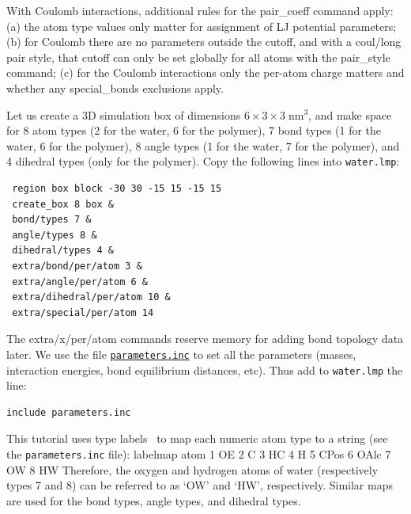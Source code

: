 \documentclass[9pt,tutorial]{livecoms}
\newcommand{\lmpcmd}[1]{\colorbox{listing}{\textcolor{command}{\small{#1}}}} %
\newcommand{\lmpcmdnote}[1]{\colorbox{note_listing}{\textcolor{command}{\small{#1}}}} %
\newcommand{\flecmd}[1]{\textcolor{command}{\texttt{#1}}} %
\newcommand{\dwlcmd}[1]{\textcolor{download}{\texttt{#1}}} %
\newcommand{\filepath}{https://raw.githubusercontent.com/lammpstutorials/lammpstutorials-article/main/files/}
\begin{document}
\begin{note} {\color{blue}With Coulomb interactions, additional rules
    for the \lmpcmd{pair\_coeff} command apply: (a) the atom type values
    only matter for assignment of LJ potential parameters; (b) for Coulomb
    there are no parameters outside the cutoff, and with a
    \lmpcmd{coul/long} pair style, that cutoff can only be set globally
    for all atoms with the \lmpcmd{pair\_style}  command;  (c) for the
    Coulomb interactions only the per-atom charge matters and whether
    any \lmpcmd{special\_bonds} exclusions apply.}
\end{note}

Let us create a 3D simulation box of dimensions $6 \times 3 \times 3 \; \text{nm}^3$,
and make space for 8 atom types (2 for the water, 6 for the polymer), 7 bond types
(1 for the water, 6 for the polymer), 8 angle types (1 for the water, 7 for the polymer),
and 4 dihedral types (only for the polymer).  Copy the following lines into \flecmd{water.lmp}:
\begin{lstlisting}
 region box block -30 30 -15 15 -15 15
 create_box 8 box &
 bond/types 7 &
 angle/types 8 &
 dihedral/types 4 &
 extra/bond/per/atom 3 &
 extra/angle/per/atom 6 &
 extra/dihedral/per/atom 10 &
 extra/special/per/atom 14
\end{lstlisting}
The \lmpcmd{extra/x/per/atom} commands reserve memory for adding bond topology
data later. We use the file \href{\filepath tutorial3/parameters.inc}{\dwlcmd{parameters.inc}}
to set all the parameters (masses, interaction energies, bond equilibrium
distances, etc).  Thus add to \flecmd{water.lmp} the line:
\begin{lstlisting}
include parameters.inc
\end{lstlisting}

\begin{note}
  This tutorial uses type labels~\cite{gissinger2024type} to map each
  numeric atom type to a string (see the \flecmd{parameters.inc} file):
  \lmpcmdnote{labelmap atom 1 OE 2 C 3 HC 4 H 5 CPos 6 OAlc 7 OW 8 HW}
  Therefore, the oxygen and hydrogen atoms of water (respectively types
  7 and 8) can be referred to as `OW' and `HW', respectively.  Similar
  maps are used for the bond types, angle types, and dihedral types.
\end{note}
\end{document}
